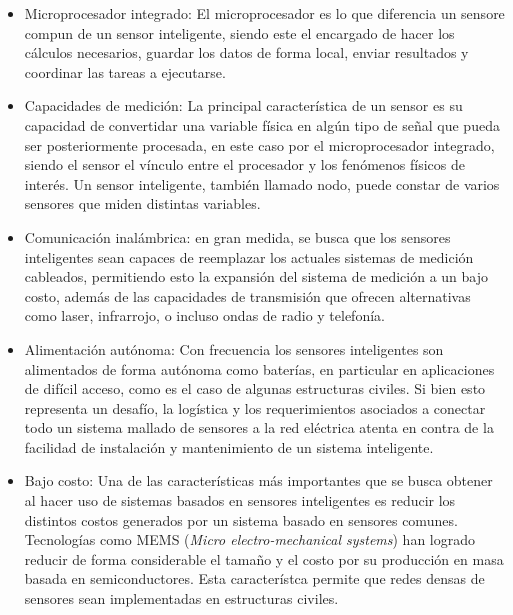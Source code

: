 \begin{itemize}
    \item Microprocesador integrado: El microprocesador es lo que diferencia un sensore compun de un sensor inteligente, siendo este el encargado de hacer los cálculos necesarios, guardar los datos de forma local, enviar resultados y coordinar las tareas a ejecutarse. 
    
    \item Capacidades de medición: La principal característica de un sensor es su capacidad de convertidar una variable física en algún tipo de señal que pueda ser posteriormente procesada, en este caso por el microprocesador integrado, siendo el sensor el vínculo entre el procesador y los fenómenos físicos de interés. Un sensor inteligente, también llamado nodo, puede constar de varios sensores que miden distintas variables.
    
    \item Comunicación inalámbrica: en gran medida, se busca que los sensores inteligentes sean capaces de reemplazar los actuales sistemas de medición cableados, permitiendo esto la expansión del sistema de medición a un bajo costo, además de las capacidades de transmisión que ofrecen alternativas como laser, infrarrojo, o incluso ondas de radio y telefonía.
    
    \item Alimentación autónoma: Con frecuencia los sensores inteligentes son alimentados de forma autónoma como baterías, en particular en aplicaciones de difícil acceso, como es el caso de algunas estructuras civiles. Si bien esto representa un desafío, la logística y los requerimientos asociados a conectar todo un sistema mallado de sensores a la red eléctrica atenta en contra de la facilidad de instalación y mantenimiento de un sistema inteligente.
    
    \item Bajo costo: Una de las características más importantes que se busca obtener al hacer uso de sistemas basados en sensores inteligentes es reducir los distintos costos generados por un sistema basado en sensores comunes. Tecnologías como MEMS (\textit{Micro electro-mechanical systems}) han logrado reducir de forma considerable el tamaño y el costo por su producción en masa basada en semiconductores. Esta característca permite que redes densas de sensores sean implementadas en estructuras civiles.
\end{itemize}



